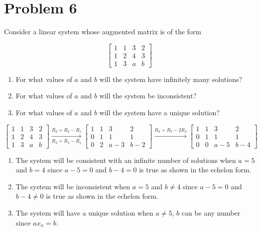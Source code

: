 \documentclass[letter,11pt]{article}
\begin{document}
\section{Problem 6}
Consider a linear system whose augmented matrix is of the form

$$\begin{bmatrix} 1 & 1 & 3 & 2\\ 1 & 2 & 4 & 3\\ 1 & 3 & a & b \end{bmatrix}$$
\begin{enumerate}[label = \alph*.]
    \item For what values of $a$ and $b$ will the system have infinitely many solutions?
    \item For what values of $a$ and $b$ will the system be inconsistent?
    \item For what values of $a$ and $b$ will the system have a unique solution?
\end{enumerate}

\begin{tcolorbox}[boxrule=1mm, width=(.9\linewidth),before=\hfill,after=\hfill, adjusted title={Problem 6 Solution}]
$$\begin{bmatrix}
1 & 1 & 3 & 2 \\
1 & 2 & 4 & 3 \\
1 & 3 & a & b
\end{bmatrix} \xrightarrow[R_3=R_3-R_1]{R_2=R_2-R_1}
\begin{bmatrix}
1 & 1 & 3 & 2 \\
0 & 1 & 1 & 1 \\
0 & 2 & a-3 & b-2
\end{bmatrix}\xrightarrow{R_3=R_3-2R_2}
\begin{bmatrix}
1 & 1 & 3 & 2 \\
0 & 1 & 1 & 1 \\
0 & 0 & a-5 & b-4
\end{bmatrix}
$$
\tcblower
\begin{enumerate}[label = \alph*.]
    \item The system will be consistent with an infinite number of solutions when $a=5$ and $b=4$  since $a-5 = 0$ and $b-4 = 0$ is true as shown in the echelon form. 
    \item The system will be inconsistent when $a=5$ and $b\neq4$  since $a-5 = 0$ and $b-4 \neq 0$ is true as shown in the echelon form. 
    \item The system will have a unique solution when $a\neq5$, $b$ can be any number since $ax_n = b$. 
\end{enumerate}
\end{tcolorbox}
\end{document}
